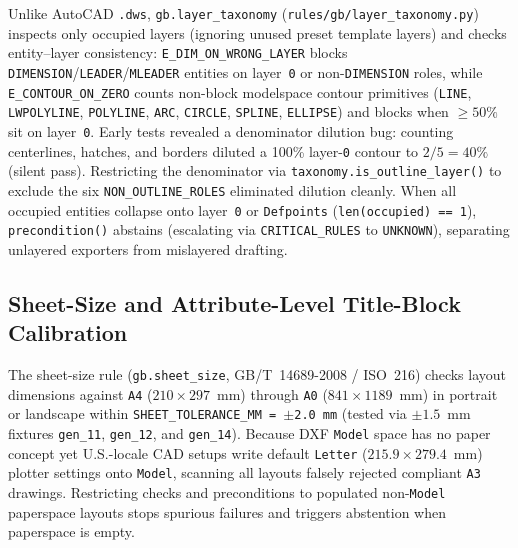 \documentclass[nocopyright,nolists,upint,varvw,hyphenate]{asmejour}
\begin{document}
Unlike AutoCAD \texttt{.dws}, \texttt{gb.\allowbreak layer\_\allowbreak taxonomy} (\texttt{rules/\allowbreak gb/\allowbreak layer\_\allowbreak taxonomy.py}) inspects only occupied layers (ignoring unused preset template layers) and checks entity--layer consistency: \texttt{E\_DIM\_\allowbreak ON\_WRONG\_\allowbreak LAYER} blocks \texttt{DIMENSION}/\allowbreak\texttt{LEADER}/\allowbreak\texttt{MLEADER} entities on layer~\texttt{0} or non-\texttt{DIMENSION} roles, while \texttt{E\_CONTOUR\_\allowbreak ON\_ZERO} counts non-block modelspace contour primitives (\texttt{LINE}, \texttt{LWPOLYLINE}, \texttt{POLYLINE}, \texttt{ARC}, \texttt{CIRCLE}, \texttt{SPLINE}, \texttt{ELLIPSE}) and blocks when $\ge 50\%$ sit on layer~\texttt{0}. Early tests revealed a denominator dilution bug: counting centerlines, hatches, and borders diluted a 100\% layer-\texttt{0} contour to $2/5 = 40\%$ (silent pass). Restricting the denominator via \texttt{taxonomy.\allowbreak is\_outline\_\allowbreak layer()} to exclude the six \texttt{NON\_OUTLINE\_\allowbreak ROLES} eliminated dilution cleanly. When all occupied entities collapse onto layer~\texttt{0} or \texttt{Defpoints} (\texttt{len(occupied) == 1}), \texttt{precondition()} abstains (escalating via \texttt{CRITICAL\_\allowbreak RULES} to \texttt{UNKNOWN}), separating unlayered exporters from mislayered drafting.

\subsection{Sheet-Size and Attribute-Level Title-Block Calibration}\label{sec:sheet_title}

The sheet-size rule (\texttt{gb.sheet\_size}, GB/T~14689-2008 / ISO~216) checks layout dimensions against \texttt{A4} ($210 \times 297$~mm) through \texttt{A0} ($841 \times 1189$~mm) in portrait or landscape within \texttt{SHEET\_TOLERANCE\_MM = $\pm$2.0~mm} (tested via $\pm 1.5$~mm fixtures \texttt{gen\_11}, \texttt{gen\_12}, and \texttt{gen\_14}). Because DXF \texttt{Model} space has no paper concept yet U.S.-locale CAD setups write default \texttt{Letter} ($215.9 \times 279.4$~mm) plotter settings onto \texttt{Model}, scanning all layouts falsely rejected compliant \texttt{A3} drawings. Restricting checks and preconditions to populated non-\texttt{Model} paperspace layouts stops spurious failures and triggers abstention when paperspace is empty.
\end{document}

